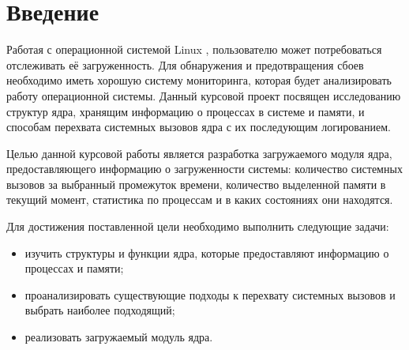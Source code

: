 \chapter*{Введение}

Работая с операционной системой Linux \cite{linux}, пользователю может потребоваться отслеживать её загруженность. Для обнаружения и предотвращения сбоев необходимо иметь хорошую систему мониторинга, которая будет анализировать работу операционной системы. Данный курсовой проект посвящен исследованию структур ядра, хранящим информацию о процессах в системе и памяти, и способам перехвата системных вызовов ядра с их последующим логированием.

Целью данной курсовой работы является разработка загружаемого модуля ядра, предоставляющего информацию о загруженности системы: количество системных вызовов за выбранный промежуток времени, количество выделенной памяти в текущий момент, статистика по процессам и в каких состояниях они находятся.

Для достижения поставленной цели необходимо выполнить следующие задачи:

\begin{itemize}
	\item изучить структуры и функции ядра, которые предоставляют информацию о процессах и памяти;
	\item проанализировать существующие подходы к перехвату системных вызовов и выбрать наиболее подходящий;
	\item реализовать загружаемый модуль ядра.
\end{itemize}